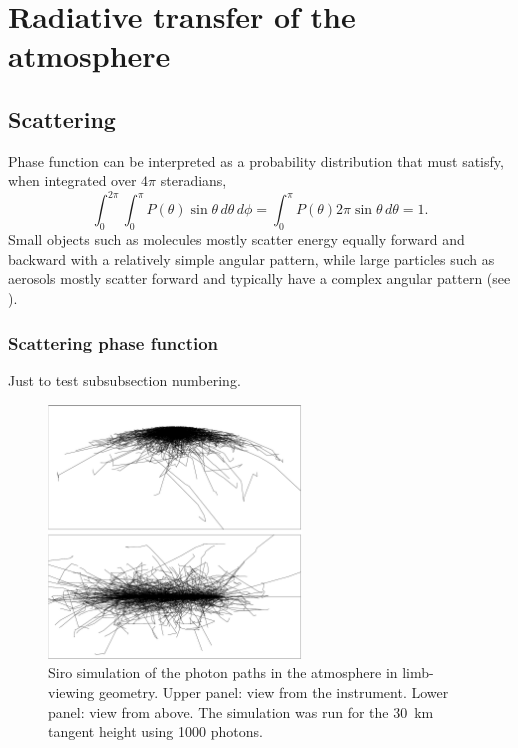 
\section{Radiative transfer of the atmosphere}
\label{radiative}

\subsection{Scattering}
\label{scattering}

Phase function can be interpreted as a probability distribution that must satisfy, when 
integrated over $4\pi$ steradians,
\begin{equation}
  \int_{0}^{2\pi}\int_{0}^{\pi} P(\theta) \sin \theta \, d \theta \, d \phi = \int_0^\pi P(\theta) 2 \pi \sin \theta\, d \theta = 1.
  \label{phase_prob}
\end{equation}
Small objects such as molecules mostly scatter energy equally forward and backward with
a relatively simple angular pattern, while large particles such as aerosols mostly scatter 
forward and typically have a complex angular pattern (see \citet{TukiainenEtAl08}).

\subsubsection{Scattering phase function}
\label{dumdidum}

Just to test subsubsection numbering.


\begin{figure}[h]
    \centering
    \includegraphics[width=0.6\textwidth]{images/sirotraje.pdf}
    \caption{Siro simulation of the photon paths in the atmosphere in limb-viewing geometry. Upper panel: view from the instrument. Lower panel: view from above. 
      The simulation was run for the 30~km tangent height using 1000 photons.}
    \label{siro_trajectories}
\end{figure}
